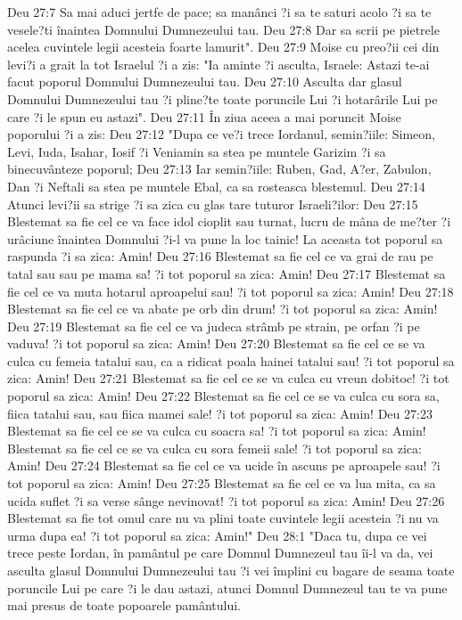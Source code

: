 Deu 27:7  Sa mai aduci jertfe de pace; sa manânci ?i sa te saturi acolo ?i sa te vesele?ti înaintea Domnului Dumnezeului tau.
Deu 27:8  Dar sa scrii pe pietrele acelea cuvintele legii acesteia foarte lamurit".
Deu 27:9  Moise cu preo?ii cei din levi?i a grait la tot Israelul ?i a zis: "Ia aminte ?i asculta, Israele: Astazi te-ai facut poporul Domnului Dumnezeului tau.
Deu 27:10  Asculta dar glasul Domnului Dumnezeului tau ?i pline?te toate poruncile Lui ?i hotarârile Lui pe care ?i le spun eu astazi".
Deu 27:11  În ziua aceea a mai poruncit Moise poporului ?i a zis:
Deu 27:12  "Dupa ce ve?i trece Iordanul, semin?iile: Simeon, Levi, Iuda, Isahar, Iosif ?i Veniamin sa stea pe muntele Garizim ?i sa binecuvânteze poporul;
Deu 27:13  Iar semin?iile: Ruben, Gad, A?er, Zabulon, Dan ?i Neftali sa stea pe muntele Ebal, ca sa rosteasca blestemul.
Deu 27:14  Atunci levi?ii sa strige ?i sa zica cu glas tare tuturor Israeli?ilor:
Deu 27:15  Blestemat sa fie cel ce va face idol cioplit sau turnat, lucru de mâna de me?ter ?i urâciune înaintea Domnului ?i-l va pune la loc tainic! La aceasta tot poporul sa raspunda ?i sa zica: Amin!
Deu 27:16  Blestemat sa fie cel ce va grai de rau pe tatal sau sau pe mama sa! ?i tot poporul sa zica: Amin!
Deu 27:17  Blestemat sa fie cel ce va muta hotarul aproapelui sau! ?i tot poporul sa zica: Amin!
Deu 27:18  Blestemat sa fie cel ce va abate pe orb din drum! ?i tot poporul sa zica: Amin!
Deu 27:19  Blestemat sa fie cel ce va judeca strâmb pe strain, pe orfan ?i pe vaduva! ?i tot poporul sa zica: Amin!
Deu 27:20  Blestemat sa fie cel ce se va culca cu femeia tatalui sau, ca a ridicat poala hainei tatalui sau! ?i tot poporul sa zica: Amin!
Deu 27:21  Blestemat sa fie cel ce se va culca cu vreun dobitoc! ?i tot poporul sa zica: Amin!
Deu 27:22  Blestemat sa fie cel ce se va culca cu sora sa, fiica tatalui sau, sau fiica mamei sale! ?i tot poporul sa zica: Amin!
Deu 27:23  Blestemat sa fie cel ce se va culca cu soacra sa! ?i tot poporul sa zica: Amin! Blestemat sa fie cel ce se va culca cu sora femeii sale! ?i tot poporul sa zica: Amin!
Deu 27:24  Blestemat sa fie cel ce va ucide în ascuns pe aproapele sau! ?i tot poporul sa zica: Amin!
Deu 27:25  Blestemat sa fie cel ce va lua mita, ca sa ucida suflet ?i sa verse sânge nevinovat! ?i tot poporul sa zica: Amin!
Deu 27:26  Blestemat sa fie tot omul care nu va plini toate cuvintele legii acesteia ?i nu va urma dupa ea! ?i tot poporul sa zica: Amin!"
Deu 28:1  "Daca tu, dupa ce vei trece peste Iordan, în pamântul pe care Domnul Dumnezeul tau îi-l va da, vei asculta glasul Domnului Dumnezeului tau ?i vei împlini cu bagare de seama toate poruncile Lui pe care ?i le dau astazi, atunci Domnul Dumnezeul tau te va pune mai presus de toate popoarele pamântului.
